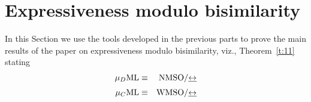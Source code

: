 
\section{Expressiveness modulo bisimilarity}
   \label{sec:expresso}

In this Section we use the tools developed in the previous parts to prove the
main results of the paper on expressiveness modulo bisimilarity, viz., 
Theorem~\ref{t:11} stating
\begin{eqnarray}
   \AFMC &\equiv& \nmso / {\bis} 
   \label{eq:z11}
\\[1mm] \mucML &\equiv& \wmso / {\bis} 
   \label{eq:z12}
\end{eqnarray}

